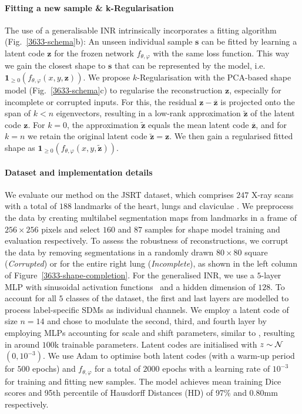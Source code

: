 \paragraph{Fitting a new sample \& k-Regularisation}
The use of a generalisable INR intrinsically incorporates a fitting algorithm (Fig.~\ref{3633-schema}b): An unseen individual sample $\boldsymbol{s}$ can be fitted by learning a latent code $\boldsymbol{z}$ for the frozen network $f_{\theta,\varphi}$ with the same loss function. 
This way we gain the closest shape to $\boldsymbol{s}$ that can be represented by the model, i.e. $\boldsymbol{1}_{\ge 0}(f_{\theta,\varphi}(x,y,\boldsymbol{z}))$. 
We propose $k$-Regularisation with the PCA-based shape model (Fig.~\ref{3633-schema}c) to regularise the reconstruction $\boldsymbol{z}$, especially for incomplete or corrupted inputs. For this, the residual $\boldsymbol{z}-\boldsymbol{\overline{z}}$ is projected onto the span of $k<n$ eigenvectors, resulting in a low-rank approximation $\boldsymbol{\tilde{z}}$ of the latent code $\boldsymbol{z}$. For $k=0$, the approximation $\boldsymbol{\tilde{z}}$ equals the mean latent code $\boldsymbol{\overline{z}}$, and for $k=n$ we retain the original latent code $\boldsymbol{\tilde{z}}=\boldsymbol{z}$. We then gain a regularised fitted shape as $\boldsymbol{1}_{\ge 0}(f_{\theta,\varphi}(x,y,\boldsymbol{\tilde{z}}))$.




\paragraph{Dataset and implementation details}

We evaluate our method on the JSRT dataset, which comprises $247$ X-ray scans with a total of $188$ landmarks of the heart, lungs and claviculae \citep{JSRT, jsrt_landmarks1}. We preprocess the data by creating multilabel segmentation maps from landmarks in a frame of $256\!\times\!256$ pixels and select $160$ and $87$ samples for shape model training and evaluation respectively. To assess the robustness of reconstructions, we corrupt the data by removing segmentations in a randomly drawn $80\!\times\!80$ square (\emph{Corrupted}) or for the entire right lung (\emph{Incomplete}), as shown in the left column of Figure~\ref{3633-shape-completion}.  
For the generalised INR, we use a $5$-layer MLP with sinusoidal activation functions~\citep{sitzmann2020implicit} and a hidden dimension of $128$. To account for all $5$ classes of the dataset, the first and last layers are modelled to process label-specific SDMs as individual channels. We employ a latent code of size $n=14$ and chose to modulate the second, third, and fourth layer by employing MLPs accounting for scale and shift parameters, similar to \citep{dannecker2024cina}, resulting in around $100$k trainable parameters. Latent codes are initialised with $z \sim \cal{N}$$(0,10^{-3})$. We use Adam to optimise both latent codes (with a warm-up period for $500$ epochs) and $f_{\theta,\varphi}$ for a total of $2000$ epochs with a learning rate of $10^{-3}$ for training and fitting new samples. The model achieves mean training Dice scores and 95th percentile of Hausdorff Distances (HD) of 97\% and 0.80mm respectively.



